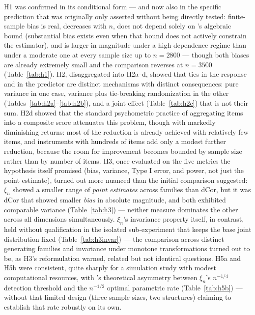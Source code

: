 \documentclass[article]{ajs}
\begin{document}
H1 was confirmed in its conditional form --- and now also in the
specific prediction that was originally only asserted without being
directly tested: finite-sample bias is real, decreases with $n$, does
not depend solely on \citet{dalitz2024}'s algebraic bound (substantial
bias exists even when that bound does not actively constrain the
estimator), and is larger in magnitude under a high dependence regime
than under a moderate one at every sample size up to $n=2800$ ---
though both biases are already extremely small and the comparison
reverses at $n=3500$ (Table~\ref{tab:h1}). H2, disaggregated into
H2a--d, showed that ties in the response and in the predictor are
distinct mechanisms with distinct consequences: pure variance in one
case, variance plus tie-breaking randomization in the other
(Tables~\ref{tab:h2a}--\ref{tab:h2b}), and a joint effect
(Table~\ref{tab:h2c}) that is not their sum. H2d showed that the
standard psychometric practice of aggregating items into a composite
score attenuates this problem, though with markedly diminishing
returns: most of the reduction is already achieved with relatively few
items, and instruments with hundreds of items add only a modest further
reduction, because the room for improvement becomes bounded by sample
size rather than by number of items. H3, once evaluated on the five
metrics the hypothesis itself promised (bias, variance, Type I error,
and power, not just the point estimate), turned out more nuanced than
the initial comparison suggested: $\xi_n$ showed a smaller range of
\emph{point estimates} across families than dCor, but it was dCor that
showed smaller \emph{bias} in absolute magnitude, and both exhibited
comparable variance (Table~\ref{tab:h3}) --- neither measure dominates
the other across all dimensions simultaneously. $\xi_n$'s invariance
property itself, in contrast, held without qualification in the
isolated sub-experiment that keeps the base joint distribution fixed
(Table~\ref{tab:h3invar}) --- the comparison across distinct generating
families and invariance under monotone transformations turned out to
be, as H3's reformulation warned, related but not identical questions.
H5a and H5b were consistent, quite sharply for a simulation study with
modest computational resources, with \citet{auddy2024}'s theoretical
asymmetry between $\xi_n$'s $n^{-1/4}$ detection threshold and the
$n^{-1/2}$ optimal parametric rate (Table~\ref{tab:h5b}) --- without
that limited design (three sample sizes, two structures) claiming to
establish that rate robustly on its own.
\end{document}
